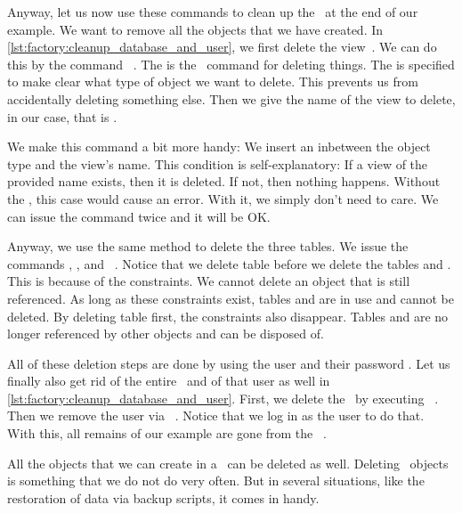 Anyway, let us now use these commands to clean up the \dbms\ at the end of our example.
We want to remove all the objects that we have created.
In \cref{lst:factory:cleanup_database_and_user}, we first delete the view~.
We can do this by the command ~\cite{PGDG:PD:DV}.
The  is the \sql\ command for deleting things.
The  is specified to make clear what type of object we want to delete.
This prevents us from accidentally deleting something else.
Then we give the name of the view to delete, in our case, that is .

We make this command a bit more handy:
We insert an  inbetween the object type and the view's name.
This condition is self-explanatory:
If a view of the provided name exists, then it is deleted.
If not, then nothing happens.
Without the , this case would cause an error.
With it, we simply don't need to care.
We can issue the command twice and it will be OK.%
%
\begin{sloppypar}%
Anyway, we use the same method to delete the three tables.
We issue the commands , , and ~\cite{PGDG:PD:DT}.
Notice that we delete table  before we delete the tables  and .
This is because of the  constraints.
We cannot delete an object that is still referenced.
As long as these constraints exist, tables  and  are in use and cannot be deleted.
By deleting table  first, the constraints also disappear.
Tables  and  are no longer referenced by other objects and can be disposed of.%
\end{sloppypar}%
%
All of these deletion steps are done by using the user  and their password .
Let us finally also get rid of the entire \db\ and of that user as well in \cref{lst:factory:cleanup_database_and_user}.
First, we delete the \db\ by executing ~\cite{PGDG:PD:DD}.
Then we remove the user via ~\cite{PGDG:PD:DU}.
Notice that we log in as the  user  to do that.
With this, all remains of our example are gone from the \dbms\ .

All the objects that we can create in a \dbms\ can be deleted as well.
Deleting \db\ objects is something that we do not do very often.
But in several situations, like the restoration of data via backup scripts, it comes in handy.%
%
\FloatBarrier%
\endhsection%
%
